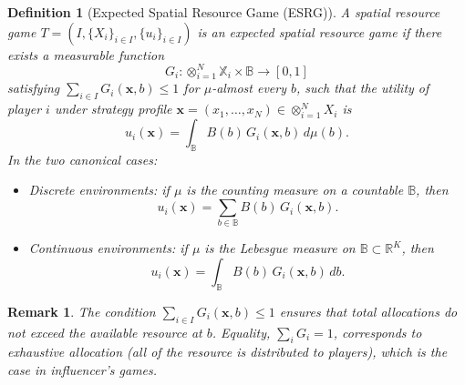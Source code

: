 \documentclass{article}
\newtheorem{definition}{Definition}
\newtheorem{remark}{Remark}
\begin{document}
            \begin{definition}[Expected Spatial Resource Game (ESRG)]\label{def:SI_ESRG}
                A spatial resource game $T = (I, \{X_i\}_{i\in I}, \{u_i\}_{i\in I})$ is an expected spatial resource game if there exists a measurable function
                \[
                    G_i : \otimes_{i=1}^N \mathbb{X}_i \times \mathbb{B} \to [0,1]
                \]
                satisfying $\sum_{i \in I} G_i(\mathbf{x},b) \leq 1$ for $\mu$-almost every $b$, such that the utility of player $i$ under strategy profile $\mathbf{x} = (x_1,\dots,x_N) \in \otimes_{i=1}^N X_i$ is
                \begin{equation}\label{eq:SI_ESRG_utility}
                    u_i(\mathbf{x}) = \int_{\mathbb{B}} B(b)\, G_i(\mathbf{x},b)\, d\mu(b).
                \end{equation}
                In the two canonical cases:\smallskip
                \begin{itemize}
                    \item Discrete environments: if $\mu$ is the counting measure on a countable $\mathbb{B}$, then
                    \begin{equation}\label{eq:SI_disc_ESRG}
                        u_i(\mathbf{x}) = \sum_{b\in\mathbb{B}} B(b)\,G_i(\mathbf{x},b).
                    \end{equation}
                    \item Continuous environments: if $\mu$ is the Lebesgue measure on $\mathbb{B}\subset\mathbb{R}^K$, then
                    \begin{equation}\label{eq:SI_cont_ESRG}
                        u_i(\mathbf{x}) = \int_{\mathbb{B}} B(b)\,G_i(\mathbf{x},b)\,db.
                    \end{equation}
                \end{itemize}
            \end{definition}
            \begin{remark}
                The condition $\sum_{i\in I} G_i(\mathbf{x},b) \leq 1$ ensures that total allocations do not exceed the available resource at $b$. Equality, $\sum_{i} G_i = 1$, corresponds to exhaustive allocation (all of the resource is distributed to players), which is the case in influencer's games.
            \end{remark}
\end{document}
